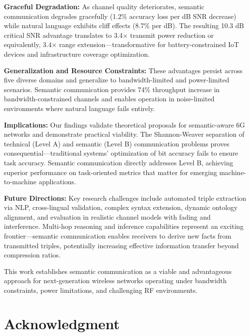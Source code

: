 \documentclass[conference]{IEEEtran}
\begin{document}
\textbf{Graceful Degradation:} As channel quality deteriorates, semantic 
communication degrades gracefully (1.2\% accuracy loss per dB SNR decrease) 
while natural language exhibits cliff effects (8.7\% per dB). The resulting 
10.3 dB critical SNR advantage translates to 3.4× transmit power reduction 
or equivalently, 3.4× range extension—transformative for battery-constrained 
IoT devices and infrastructure coverage optimization.

\textbf{Generalization and Resource Constraints:} These advantages persist 
across five diverse domains and generalize to bandwidth-limited and power-limited 
scenarios. Semantic communication provides 74\% throughput increase in 
bandwidth-constrained channels and enables operation in noise-limited 
environments where natural language fails entirely.

\textbf{Implications:} Our findings validate theoretical proposals for 
semantic-aware 6G networks and demonstrate practical viability. The Shannon-Weaver 
separation of technical (Level A) and semantic (Level B) communication 
problems proves consequential—traditional systems' optimization of bit 
accuracy fails to ensure task accuracy. Semantic communication directly 
addresses Level B, achieving superior performance on task-oriented metrics 
that matter for emerging machine-to-machine applications.

\textbf{Future Directions:} Key research challenges include automated 
triple extraction via NLP, cross-lingual validation, complex syntax extension, 
dynamic ontology alignment, and evaluation in realistic channel models 
with fading and interference. Multi-hop reasoning and inference capabilities 
represent an exciting frontier—semantic communication enables receivers 
to derive new facts from transmitted triples, potentially increasing effective 
information transfer beyond compression ratios.

This work establishes semantic communication as a viable and advantageous 
approach for next-generation wireless networks operating under bandwidth 
constraints, power limitations, and challenging RF environments.

\section*{Acknowledgment}
\end{document}

